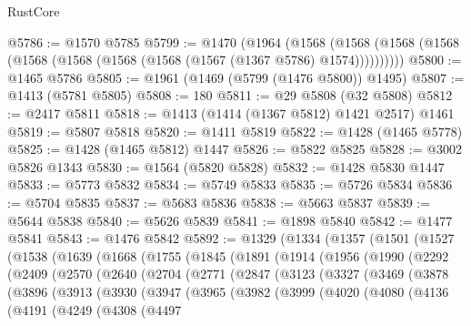 \begin{lexlean}{RustCore}
\begin{coremodule}
@5786 := @1570 @5785
@5799 := @1470
    (@1964
      (@1568 (@1568 (@1568 (@1568 (@1568 (@1568 (@1568 (@1568 (@1567 (@1367 @5786) @1574))))))))))
@5800 := @1465 @5786
@5805 := @1961 (@1469 (@5799 (@1476 @5800)) @1495)
@5807 := @1413 (@5781 @5805)
@5808 := 180
@5811 := @29 @5808 (@32 @5808)
@5812 := @2417 @5811
@5818 := @1413 (@1414 (@1367 @5812) @1421 @2517) @1461
@5819 := @5807 @5818
@5820 := @1411 @5819
@5822 := @1428 (@1465 @5778)
@5825 := @1428 (@1465 @5812) @1447
@5826 := @5822 @5825
@5828 := @3002 @5826 @1343
@5830 := @1564 (@5820 @5828)
@5832 := @1428 @5830 @1447
@5833 := @5773 @5832
@5834 := @5749 @5833
@5835 := @5726 @5834
@5836 := @5704 @5835
@5837 := @5683 @5836
@5838 := @5663 @5837
@5839 := @5644 @5838
@5840 := @5626 @5839
@5841 := @1898 @5840
@5842 := @1477 @5841
@5843 := @1476 @5842
@5892 := @1329
    (@1334
      (@1357
        (@1501
          (@1527
            (@1538
              (@1639
                (@1668
                  (@1755
                    (@1845
                      (@1891
                        (@1914
                          (@1956
                            (@1990
                              (@2292
                                (@2409
                                  (@2570
                                    (@2640
                                      (@2704
                                        (@2771
                                          (@2847
                                            (@3123
                                              (@3327
                                                (@3469
                                                  (@3878
                                                    (@3896
                                                      (@3913
                                                        (@3930
                                                          (@3947
                                                            (@3965
                                                              (@3982
                                                                (@3999
                                                                  (@4020
                                                                    (@4080
                                                                      (@4136
                                                                        (@4191
                                                                          (@4249
                                                                            (@4308
                                                                              (@4497

\end{coremodule}
\end{lexlean}
